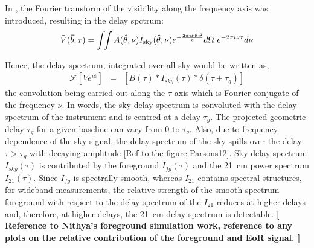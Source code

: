 \documentclass[12pt,preprint]{aastex}
\newcommand{\sky}{{\rm sky}}
\newcommand{\bm}{{A}}
\newcommand{\thhat}{{\hat\theta}}
\newcommand{\ifngexp}{{e^{-\frac{2\pi i\nu\vec{b}\cdot\thhat}{c}}}}
\begin{document}
In \citet{parsons_et_al2012a}, the Fourier transform of the visibility along the frequency axis was introduced,
resulting in the delay spctrum:
\begin{equation}
\tilde V(\vec b, \tau)  = \int\!\!\int{\bm(\thhat,\nu) I_\sky(\thhat,\nu) \ifngexp d\Omega~e^{-2\pi i\nu\tau} d\nu}
\label{eq3}
\end{equation}

Hence, the delay spectrum, integrated over all sky would be written as, 
\begin{eqnarray}
\mathcal{F} \left [V e^{i\phi}\right]   & = &  \left [B(\tau)\ast I_{sky}(\tau) \ast \delta(\tau+\tau_{g}) \right ] 	
\label{eq4}
\end{eqnarray}
the convolution being carried out along the $\tau$ axis which is Fourier conjugate of the frequency $\nu$. In words, the sky delay spectrum is convoluted with the delay spectrum of the instrument and is centred at a delay $\tau_{g}$. The projected geometric delay $\tau_{g}$ for a given baseline can vary from 0 to $\tau_{g}$. Also, due to frequency dependence of the sky signal, the delay spectrum of the sky spills over the delay $\tau> \tau_{g}$ with decaying amplitude [Ref to the figure Parsons12]. Sky delay spectrum $I_{sky}(\tau)$ is contributed by the foreground  $I_{fg}(\tau)$ and the 21~cm power spectrum $I_{21}(\tau)$. Since $I_{fg}$ is spectrally smooth, whereas $I_{21}$ contains spectral structures, for wideband measurements, the relative strength of the smooth spectrum foreground with respect to the delay spectrum of the $I_{21}$ reduces at higher delays and, therefore, at higher delays, the 21~cm delay spectrum is detectable.  \textbf{[ Reference to Nithya's foreground simulation work, reference to any plots on the relative contribution of the  foreground and EoR signal. ]}
\end{document}
